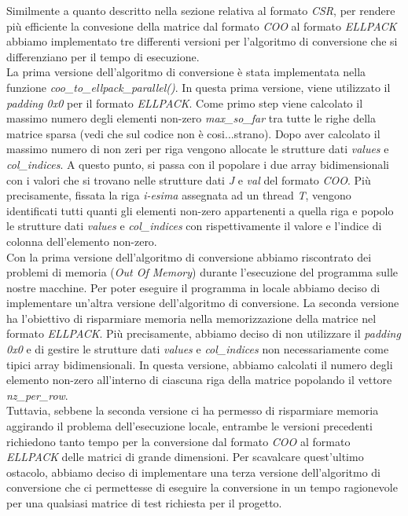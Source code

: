 \documentclass{article}
\begin{document}
Similmente a quanto descritto nella sezione relativa al formato \textit{CSR}, per rendere più efficiente la convesione della matrice dal formato \textit{COO} al formato \textit{ELLPACK} abbiamo implementato tre differenti versioni per l'algoritmo di conversione che si differenziano per il tempo di esecuzione.\\

La prima versione dell'algoritmo di conversione è stata implementata nella funzione \textit{coo\_to\_ellpack\_parallel()}. In questa prima versione, viene utilizzato il \textit{padding 0x0} per il formato \textit{ELLPACK}. Come primo step viene calcolato il massimo numero degli elementi non-zero \textit{max\_so\_far} tra tutte le righe della matrice sparsa (vedi che sul codice non è cosi...strano). Dopo aver calcolato il massimo numero di non zeri per riga vengono allocate le strutture dati \textit{values} e \textit{col\_indices}. A questo punto, si passa con il popolare i due array bidimensionali con i valori che si trovano nelle strutture dati \textit{J} e \textit{val} del formato \textit{COO}. Più precisamente, fissata la riga \textit{i-esima} assegnata ad un thread \textit{T}, vengono identificati tutti quanti gli elementi non-zero appartenenti a quella riga e popolo le strutture dati \textit{values} e \textit{col\_indices} con rispettivamente il valore e l'indice di colonna dell'elemento non-zero.\\

Con la prima versione dell'algoritmo di conversione abbiamo riscontrato dei problemi di memoria (\textit{Out Of Memory}) durante l'esecuzione del programma sulle nostre macchine. Per poter eseguire il programma in locale abbiamo deciso di implementare un'altra versione dell'algoritmo di conversione. La seconda versione ha l'obiettivo di risparmiare memoria nella memorizzazione della matrice nel formato \textit{ELLPACK}. Più precisamente, abbiamo deciso di non utilizzare il \textit{padding 0x0} e di gestire le strutture dati \textit{values} e \textit{col\_indices} non necessariamente come tipici array bidimensionali. In questa versione, abbiamo calcolati il numero degli elemento non-zero all'interno di ciascuna riga della matrice popolando il vettore \textit{nz\_per\_row}.\\

Tuttavia, sebbene la seconda versione ci ha permesso di risparmiare memoria aggirando il problema dell'esecuzione locale, entrambe le versioni precedenti richiedono tanto tempo per la conversione dal formato \textit{COO} al formato \textit{ELLPACK} delle matrici di grande dimensioni. Per scavalcare quest'ultimo ostacolo, abbiamo deciso di implementare una terza versione dell'algoritmo di conversione che ci permettesse di eseguire la conversione in un tempo ragionevole per una qualsiasi matrice di test richiesta per il progetto.\\
\end{document}
